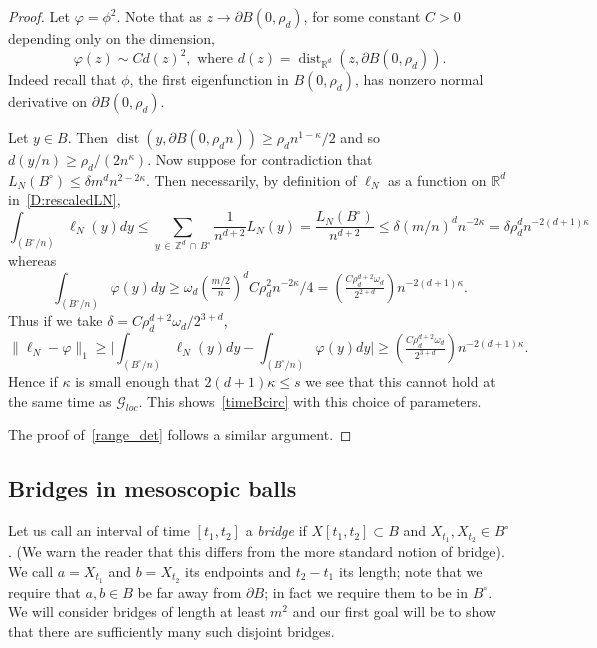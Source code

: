 \documentclass[10pt]{amsart}
\theoremstyle{definition}\newtheorem{defi}[theo]{Definition}\newtheorem{rema}[theo]{Remark}\newtheorem{exam}[theo]{Example}\newtheorem{exem}[theo]{Example}\newtheorem{nota}[theo]{Notation}
\DeclareMathOperator{\dist}{dist}
\newcommand*\Z {{\mathbb Z}}
\newcommand*\R{\mathbb{R}}
\newcommand{\cG}{\mathcal{G}}
\newcommand*\ph{\varphi}
\begin{document}
\begin{proof}
Let $\ph = \phi^2$. Note that as $z \to \partial B(0, \rho_d)$, for some constant $C>0$ depending only on the dimension,
\begin{equation}\label{radialderivative}
\ph(z) \sim C d(z)^2, \text{ where } d(z) = \dist_{\R^d} (z, \partial B(0, \rho_d)).
\end{equation}
Indeed recall that $\phi$, the first eigenfunction in $B(0, \rho_d)$, has nonzero normal derivative on $\partial B(0, \rho_d)$.

Let $y \in B$. Then $\dist (y, \partial B(0, \rho_d n)) \ge \rho_d n^{1- \kappa}/2$ and so $d (y / n) \ge \rho_d /(2 n^{\kappa})$. Now suppose for contradiction that $L_N(B^\circ) \le \delta m^dn^{2- 2\kappa}$. Then necessarily, by definition of $\ell_N$ as a function on $\R^d$ in~\eqref{D:rescaledLN},
\[
\int_{(B^\circ/n)} \ell_N (y) dy \le \sum_{y\,\in\,\Z^d\,\cap\,B^\circ} \frac1{n^{d+2}}L_N(y) = \frac{L_N(B^\circ) }{ n^{d+2}} \le \delta (m/n)^d n^{-2\kappa} =\delta \rho_d^d n^{ - 2(d+1) \kappa}
\]
whereas
\[
\int_{(B^\circ/n)} \ph(y) dy \ge \omega_d \left(\tfrac{m/2}{n}\right)^d C \rho_d^2 n^{-2 \kappa}/4 = \left(\tfrac{C \rho_d^{d+2}\omega_d }{2^{2+d}}\right) n^{ - 2(d+1) \kappa}.
\]
Thus if we take $\delta = C \rho_d^{d+2}\omega_d / 2^{3+d}$,
\[
\| \ell_N - \ph\|_1 \ge \Big| \int_{(B^\circ/n)} \ell_N(y) dy - \int_{(B^\circ/n)} \ph(y)dy \Big| \ge \left(\tfrac{C \rho_d^{d+2}\omega_d}{2^{3+d}}\right) n^{- 2(d+1) \kappa}.
\]
Hence if $\kappa$ is small enough that $2(d+1) \kappa \le s$ we see that this cannot hold at the same time as $\cG_{loc}$. This shows~\eqref{timeBcirc} with this choice of parameters.

The proof of~\eqref{range_det} follows a similar argument.
\end{proof}


\subsection{Bridges in mesoscopic balls}
\label{S:bridge_meso}

Let us call an interval of time $[t_1, t_2]$ a \emph{bridge} if $X[t_1, t_2] \subset B$ and $X_{t_1}, X_{t_2} \in B^\circ$. (We warn the reader that this differs from the more standard notion of bridge). We call $a = X_{t_1}$ and $b = X_{t_2}$ its endpoints and $t_2 - t_1$ its length; note that we require that $a, b \in B$ be far away from $\partial B$; in fact we require them to be in $B^\circ$. We will consider bridges of length at least $m^2$ and our first goal will be to show that there are sufficiently many such disjoint bridges.
\end{document}
